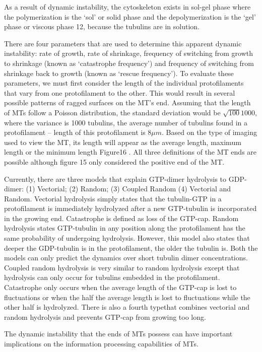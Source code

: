 \documentclass[letterpaper,final,times]{cas-dc}
\numberwithin{equation}{section}
\begin{document}
As a result of dynamic instability, the cytoskeleton exists in sol-gel phase where the polymerization is the ‘sol’ or solid phase and the depolymerization is the ‘gel’ phase or viscous phase 12, because the tubulins are in solution.

There are four parameters that are used to determine this apparent dynamic instability: rate of growth, rate of shrinkage, frequency of switching from growth to shrinkage (known as ‘catastrophe frequency’) and frequency of switching from shrinkage back to growth (known as ‘rescue frequency’). To evaluate these parameters, we must first consider the length of the individual protofilaments that vary from one protofilament to the other\citep{4}. This would result in several possible patterns of ragged surfaces on the MT’s end. Assuming that the length of MTs follow a Poisson distribution, the standard deviation would be $\sqrt{100}{1000}$, where the variance is 1000 tubulins, the average number of tubulins found in a protofilament – length of this protofilament is $8$$\mu$$m$. Based on the type of imaging used to view the MT, its length will appear as the average length, maximum length or the minimum length Figure16 . All three definitions of the MT ends are possible although figure 15 only considered the positive end of the MT\citep{4}.

Currently, there are three models that explain GTP-dimer hydrolysis to GDP-dimer: (1) Vectorial; (2) Random; (3) Coupled Random (4) Vectorial and Random. Vectorial hydrolysis simply states that the tubulin-GTP in a protofilament is immediately hydrolyzed after a new GTP-tubulin is incorporated in the growing end. Catastrophe is defined as loss of the GTP-cap. Random hydrolysis\citep{100} states GTP-tubulin in any position along the protofilament has the same probability of undergoing hydrolysis. However, this model also states that deeper the GDP-tubulin is in the protofilament, the older the tubulin is. Both the models can only predict the dynamics over short tubulin dimer concentrations\citep{4}. Coupled random hydrolysis\citep{98} is very similar to random hydrolysis except that hydrolysis can only occur for tubulins embedded in the protofilament. Catastrophe only occurs when the average length of the GTP-cap is lost to fluctuations or when the half the average length is lost to fluctuations while the other half is hydrolyzed. There is also a fourth type\citep{99}that combines vectorial and random hydrolysis and prevents GTP-cap from growing too long.

The dynamic instability that the ends of MTs possess can have important implications on the information processing capabilities of MTs.
\end{document}
